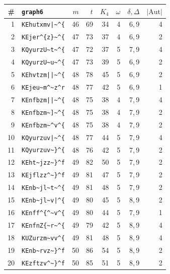 \begin{tabular}{@{}rlrrrrrr@{}}
\toprule
\# & \texttt{graph6} & $m$ & $t$ & $K_4$ & $\omega$ & $\delta,\Delta$ & $|\mathrm{Aut}|$ \\
\midrule
1 & \texttt{KEhutxmv|\textasciitilde{}\textasciicircum{}\{} & 46 & 69 & 34 & 4 & 6,\,9 & 4 \\
2 & \texttt{KEjer\textasciicircum{}\{z\}\textasciitilde{}\textasciicircum{}\{} & 47 & 73 & 37 & 4 & 6,\,9 & 2 \\
3 & \texttt{KQyurzU\textasciitilde{}t\textasciitilde{}\textasciicircum{}\{} & 47 & 72 & 37 & 5 & 7,\,9 & 4 \\
4 & \texttt{KQyurzU\textasciitilde{}u\textasciitilde{}\textasciicircum{}\{} & 47 & 73 & 39 & 5 & 6,\,9 & 2 \\
5 & \texttt{KEhvtzm||\textasciitilde{}\textasciicircum{}\{} & 48 & 78 & 45 & 5 & 6,\,9 & 2 \\
6 & \texttt{KEjeu\textasciitilde{}m\textasciicircum{}\textasciitilde{}z\textasciicircum{}r} & 48 & 77 & 42 & 5 & 6,\,9 & 1 \\
7 & \texttt{KEnfbzm||\textasciitilde{}\textasciicircum{}\{} & 48 & 75 & 38 & 4 & 7,\,9 & 4 \\
8 & \texttt{KEnfbzm\textasciitilde{}]\textasciitilde{}\textasciicircum{}\{} & 48 & 75 & 38 & 4 & 7,\,9 & 2 \\
9 & \texttt{KEnfbzm\textasciitilde{}\textasciicircum{}v\textasciicircum{}\{} & 48 & 75 & 38 & 4 & 7,\,9 & 2 \\
10 & \texttt{KQyurzuv|\textasciitilde{}\textasciicircum{}\{} & 48 & 77 & 44 & 5 & 7,\,9 & 4 \\
11 & \texttt{KQyurzuv\textasciitilde{}\}\textasciicircum{}\{} & 48 & 76 & 42 & 5 & 7,\,9 & 2 \\
12 & \texttt{KEht\textasciitilde{}jzz\textasciitilde{}\}\textasciicircum{}f} & 49 & 82 & 50 & 5 & 7,\,9 & 2 \\
13 & \texttt{KEjflzz\textasciicircum{}\textasciitilde{}\}\textasciicircum{}f} & 49 & 81 & 47 & 5 & 7,\,9 & 2 \\
14 & \texttt{KEnb\textasciitilde{}jl\textasciitilde{}t\textasciitilde{}\textasciicircum{}\{} & 49 & 81 & 48 & 5 & 7,\,9 & 2 \\
15 & \texttt{KEnb\textasciitilde{}jl\textasciitilde{}v|\textasciicircum{}\{} & 49 & 80 & 45 & 5 & 8,\,9 & 2 \\
16 & \texttt{KEnff\textasciicircum{}\{\textasciicircum{}\textasciitilde{}v\textasciicircum{}\{} & 49 & 80 & 44 & 5 & 7,\,9 & 1 \\
17 & \texttt{KEnfnZ\{\textasciitilde{}r\textasciitilde{}\textasciicircum{}\{} & 49 & 79 & 42 & 5 & 8,\,9 & 4 \\
18 & \texttt{KUZurzm\textasciitilde{}vv\textasciicircum{}\{} & 49 & 81 & 48 & 5 & 8,\,9 & 4 \\
19 & \texttt{KEnb\textasciitilde{}rvz\textasciitilde{}\}\textasciicircum{}f} & 50 & 86 & 54 & 5 & 8,\,9 & 2 \\
20 & \texttt{KEzftzv\textasciicircum{}\textasciitilde{}\}\textasciicircum{}f} & 50 & 85 & 51 & 5 & 8,\,9 & 2 \\
\bottomrule
\end{tabular}
